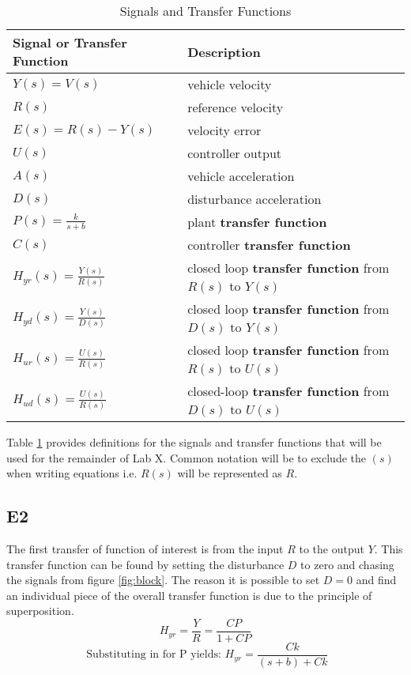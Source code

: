 \documentclass[11pt,titlepage]{article}
\begin{document}
	\begin{table}[!htb]
		\centering
		\begin{tabular}{|m{5cm}|m{9cm}|} 
		\hline
		Signal or Transfer Function & Description \\ 
		\hline
		$Y(s)=V(s)$ & vehicle velocity \\
		\hline
		$R(s)$ & reference velocity \\
		\hline
		$E(s)=R(s)-Y(s)$ & velocity error \\
		\hline
		$U(s)$ & controller output \\
		\hline
		$A(s)$ & vehicle acceleration \\
		\hline
		$D(s)$ & disturbance acceleration \\
		\hline 
		$P(s)=\frac{k}{s+b}$ & plant \textbf{transfer function} \\
		\hline 
		$C(s)$ & controller \textbf{transfer function} \\
		\hline 
		$H_{yr}(s)=\frac{Y(s)}{R(s)}$ & closed loop \textbf{transfer function} from $R(s)$ to $Y(s)$ \\
		\hline 
		$H_{yd}(s)=\frac{Y(s)}{D(s)}$ & closed loop \textbf{transfer function} from $D(s)$ to $Y(s)$ \\
		\hline 
		$H_{ur}(s)=\frac{U(s)}{R(s)}$ & closed loop \textbf{transfer function} from $R(s)$ to $U(s)$ \\
		\hline
		$H_{ud}(s)=\frac{U(s)}{R(s)}$ & closed-loop \textbf{transfer function} from $D(s)$ to $U(s)$ \\
		\hline
		\end{tabular}
		\caption{Signals and Transfer Functions} \label{table:SaTF}
		\end{table}

		\noindent Table \ref{table:SaTF} provides definitions for the signals and transfer functions that will be used for the remainder of Lab X. Common notation will be to exclude the $(s)$ when writing equations i.e. $R(s)$ will be represented as $R$.

	\subsection*{E2}
		The first transfer of function of interest is from the input $R$ to the output $Y$. This transfer function can be found by setting the disturbance $D$ to zero and chasing the signals from figure \ref{fig:block}. The reason it is possible to set $D=0$ and find an individual piece of the overall transfer function is due to the principle of superposition.
		\begin{equation}
			H_{yr}=\frac{Y}{R}=\frac{CP}{1+CP}
		\end{equation}
		\begin{equation} \label{eq:Hyr}
			\mbox{ Substituting in for P yields: } H_{yr}=\frac{Ck}{(s+b)+Ck}
		\end{equation} 
	
\end{document}
